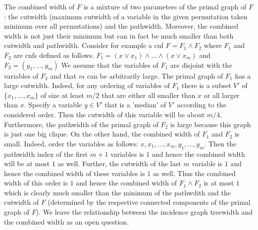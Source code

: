\documentclass{article}
\begin{document}
The combined width of $F$ is a mixture of two parameters of the primal graph of $F$: the cutwidth
(maximum cutwidth of a variable in the given permutation taken minimum over all permutations)
and the pathwidth. Moreover, the combined width is not just their minimum but can in fact be 
much smaller than both cutwidth and pathwidth. Consider for example a {\sc cnf}
$F=F_1 \wedge F_2$ where $F_1$ and $F_2$ are {\sc cnf}s defined as follows.
$F_1=(x \vee x_1) \wedge \dots \wedge (x \vee x_{m})$  and $F_2=(y_1, \dots, y_m)$
We assume that the variables of $F_1$ are disjoint with the variables of $F_2$ and that $m$
can be arbitrarily large. The primal graph of $F_1$ has a large cutwidth. Indeed, for any ordering
of variables of $F_1$ there is a subset $V'$ of $\{x_1, \dots, x_m\}$ of size at least $m/2$ that are
either all smaller than $x$ or all larger than $x$. Specify a variable $y \in V'$ that is a 'median' of $V'$
according to the considered order. Then the cutwidth of this variable will be about $m/4$.
Furthermore, the pathwidth of the primal graph of $F_2$ is large because this graph is just one big clique.
On the other hand, the combined width of $F_1$ and $F_2$ is small. Indeed, order the variables as follows:
$x,x_1, \dots, x_m,y_1, \dots, y_m$. Then the pathwidth index of the first $m+1$ variables is $1$ and hence
the combined width will be at most $1$ as well. Further, the cutwidth of the last $m$ variable is $1$ and hence
the combined width of these variables is $1$ as well. Thus the combined width of this order is $1$ and hence
the combined width of $F_1 \wedge F_2$ is at most $1$ which is clearly much smaller than the minimum of the 
pathwdith and the cutwidth of $F$ (determined by the respective connected components of the primal graph 
of $F$). We leave the relationship between the incidence graph treewidth and the combined width as an open question. 
\end{document}
